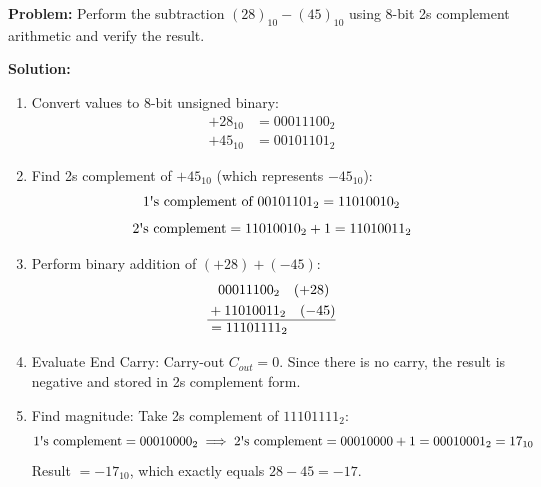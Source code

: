 \begin{examplebox}
\textbf{Problem:} Perform the subtraction $(28)_{10} - (45)_{10}$ using 8-bit 2\textquotesingle s complement arithmetic and verify the result.

\textbf{Solution:}
\begin{enumerate}
    \item Convert values to 8-bit unsigned binary:
    \begin{align*}
    +28_{10} &= 00011100_2 \\
    +45_{10} &= 00101101_2
    \end{align*}
    \item Find 2\textquotesingle s complement of $+45_{10}$ (which represents $-45_{10}$):
    \begin{equation}
    1\text{\textquotesingle s complement of } 00101101_2 = 11010010_2
    \end{equation}
    \begin{equation}
    2\text{\textquotesingle s complement} = 11010010_2 + 1 = 11010011_2
    \end{equation}
    \item Perform binary addition of $(+28) + (-45)$:
    \begin{align*}
    &\phantom{+} 00011100_2 \quad (+28) \\
    &+ 11010011_2 \quad (-45) \\
    \hline
    &= 11101111_2
    \end{align*}
    \item Evaluate End Carry: Carry-out $C_{out} = 0$. Since there is no carry, the result is negative and stored in 2\textquotesingle s complement form.
    \item Find magnitude: Take 2\textquotesingle s complement of $11101111_2$:
    \begin{equation}
    \text{1\textquotesingle s complement} = 00010000_2 \implies \text{2\textquotesingle s complement} = 00010000 + 1 = 00010001_2 = 17_{10}
    \end{equation}
    Result $= -17_{10}$, which exactly equals $28 - 45 = -17$.
\end{enumerate}
\end{examplebox}

